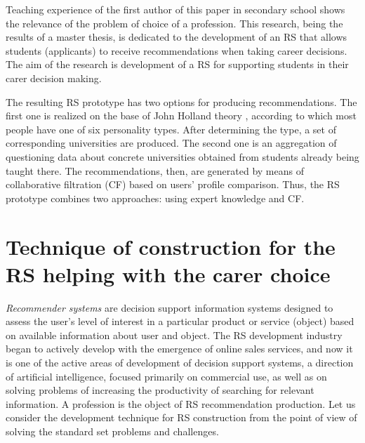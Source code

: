 \documentclass[conference,a4]{IEEEtran}
\begin{document}
Teaching experience of the first author of this paper in secondary school shows the relevance of the problem of choice of a profession.  This research, being the results of a master thesis, is dedicated to the development of an RS that allows students (applicants) to receive recommendations when taking career decisions.  The aim of the research is development of a RS for supporting students in their carer decision making.

The resulting RS prototype has two options for producing recommendations. The first one is realized on the base of John Holland theory \cite{holland}, according to which most people have one of six personality types.  After determining the type, a set of corresponding universities are produced.  The second one is an aggregation of questioning data about concrete universities obtained from students already being taught there.  The recommendations, then, are generated by means of collaborative filtration (CF) based on users' profile comparison.  Thus, the RS prototype combines two approaches: using expert knowledge and CF.


\section{Technique of construction for the RS helping with the carer choice}
\label{sec:base}

\emph{Recommender systems} \cite{rs_basics} are decision support information systems designed to assess the user's level of interest in a particular product or service (object) based on available information about user and object.  The RS development industry began to actively develop with the emergence of online sales services, and now it is one of the active areas of development of decision support systems, a direction of artificial intelligence, focused primarily on commercial use, as well as on solving problems of increasing the productivity of searching for relevant information.  A profession is the object of RS recommendation production.  Let us consider the development technique for RS construction from the point of view of solving the standard set problems and challenges.
\end{document}
